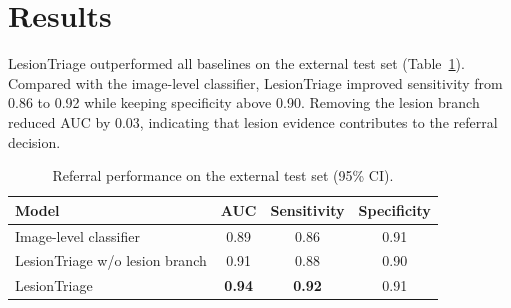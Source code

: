 \section{Results}

LesionTriage outperformed all baselines on the external test set (Table~\ref{tab:main}).
Compared with the image-level classifier, LesionTriage improved sensitivity from 0.86 to 0.92 while keeping specificity above 0.90.
Removing the lesion branch reduced AUC by 0.03, indicating that lesion evidence contributes to the referral decision.

\begin{table}[t]
\centering
\caption{Referral performance on the external test set (95\% CI).}
\label{tab:main}
\begin{tabular}{lccc}
\toprule
Model & AUC & Sensitivity & Specificity \\
\midrule
Image-level classifier & 0.89 & 0.86 & 0.91 \\
LesionTriage w/o lesion branch & 0.91 & 0.88 & 0.90 \\
LesionTriage & \textbf{0.94} & \textbf{0.92} & 0.91 \\
\bottomrule
\end{tabular}
\end{table}
